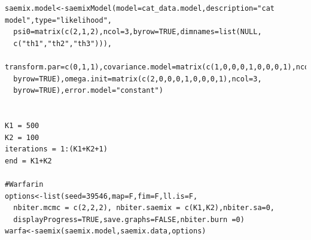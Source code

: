 \begin{lstlisting}
saemix.model<-saemixModel(model=cat_data.model,description="cat model",type="likelihood",   
  psi0=matrix(c(2,1,2),ncol=3,byrow=TRUE,dimnames=list(NULL,   
  c("th1","th2","th3"))), 
  transform.par=c(0,1,1),covariance.model=matrix(c(1,0,0,0,1,0,0,0,1),ncol=3, 
  byrow=TRUE),omega.init=matrix(c(2,0,0,0,1,0,0,0,1),ncol=3, 
  byrow=TRUE),error.model="constant")


K1 = 500
K2 = 100
iterations = 1:(K1+K2+1)
end = K1+K2

#Warfarin
options<-list(seed=39546,map=F,fim=F,ll.is=F,
  nbiter.mcmc = c(2,2,2), nbiter.saemix = c(K1,K2),nbiter.sa=0,
  displayProgress=TRUE,save.graphs=FALSE,nbiter.burn =0)
warfa<-saemix(saemix.model,saemix.data,options)
\end{lstlisting}
